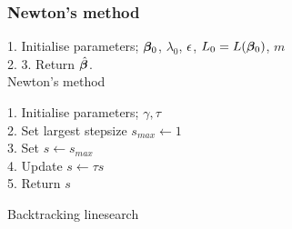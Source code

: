 \begin{appendices}
\subsubsection{Newton's method}

\begin{algorithm}[H]
    1. Initialise parameters; $\bm{\beta}_0$, $\lambda_0$, $\epsilon$, $L_0 = L(\bm{\beta}_0)$, $m$\\
    2.  
    3. Return $\hat{\bm{\beta}}$.\\
    \caption{Newton's method}
\end{algorithm}
\label{algo:newton}

\begin{algorithm}[H]
    1. Initialise parameters; $\gamma, \tau$ \\
    2. Set largest stepsize $s_{max}\leftarrow 1$ \\
    3. Set $s \leftarrow s_{max}$ \\
    4.  {
        Update $s\leftarrow \tau s$ \\
    }
    5. Return $s$
    \caption{Backtracking linesearch}
\end{algorithm}
\label{algo:line}

\end{appendices}